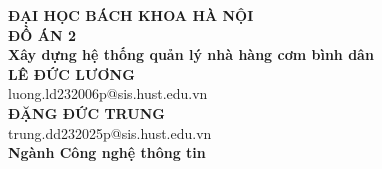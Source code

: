 \documentclass[DoAn.tex]{subfiles}
\begin{document}
    \begin{titlepage}
        \thispagestyle{empty}
        \begin{center}
            {\textbf{\large{ĐẠI HỌC BÁCH KHOA HÀ NỘI}}}\\[4cm]
            {\textbf{\huge{ ĐỒ ÁN 2}}}\\[1cm]
            {\textbf{\Large{Xây dựng hệ thống quản lý nhà hàng cơm bình dân}}}\\[1cm]
            {\textbf{\Large{LÊ ĐỨC LƯƠNG}}}\\
            {\large{luong.ld232006p@sis.hust.edu.vn}}\\[0.5cm]
            {\textbf{\Large{ĐẶNG ĐỨC TRUNG}}}\\
            {\large{trung.dd232025p@sis.hust.edu.vn}}\\[0.5cm]
            {\textbf{\large{Ngành Công nghệ thông tin}}}\\
            \vspace{2cm}

            \begin{table}[H]
\centering
{}
\end{table}

        
        \end{center}
    \end{titlepage}
\end{document}
